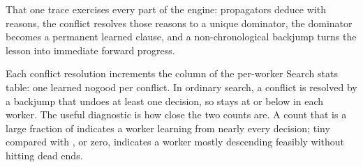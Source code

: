 That one trace exercises every part of the engine: propagators deduce with
reasons, the conflict resolves those reasons to a unique dominator, the
dominator becomes a permanent learned clause, and a non-chronological backjump
turns the lesson into immediate forward progress.

\begin{platypuslog}[htb]
Each conflict resolution increments the  column of the per-worker
\textsf{Search stats} table: one learned nogood per conflict. In ordinary search,
a conflict is resolved by a backjump that undoes at least one decision, so
 stays at or below  in each worker. The useful
diagnostic is how close the two counts are. A  count that is a
large fraction of  indicates a worker learning from nearly every
decision;  tiny compared with , or zero, indicates
a worker mostly descending feasibly without hitting dead ends.
\end{platypuslog}
